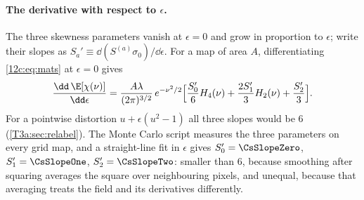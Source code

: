 \paragraph{The derivative with respect to $\epsilon$.} The three skewness parameters vanish at $\epsilon=0$ and grow in
proportion to $\epsilon$; write their slopes as $S_a'\equiv\dd(S^{(a)}\sigma_0)/\dd\epsilon$. For a map of area $A$,
differentiating \eqref{12c:eq:mats} at $\epsilon=0$ gives
\begin{equation}
  \frac{\dd\,\E[\chi(\nu)]}{\dd\epsilon}=\frac{A\lambda}{(2\pi)^{3/2}}\,e^{-\nu^2/2}
  \Bigl[\frac{S_0'}{6}H_4(\nu)+\frac{2S_1'}{3}H_2(\nu)+\frac{S_2'}{3}\Bigr] .
  \label{12c:eq:mats-deriv}
\end{equation}
For a pointwise distortion $u+\epsilon(u^2-1)$ all three slopes would be $6$ (\cref{T3a:sec:relabel}). The Monte Carlo script
 measures the three parameters on every grid map, and a straight-line fit in $\epsilon$ gives $S_0'=\CsSlopeZero$, $S_1'=\CsSlopeOne$, $S_2'=\CsSlopeTwo$: smaller than
$6$, because smoothing after squaring averages the square over neighbouring pixels, and unequal, because that averaging
treats the field and its derivatives differently.

